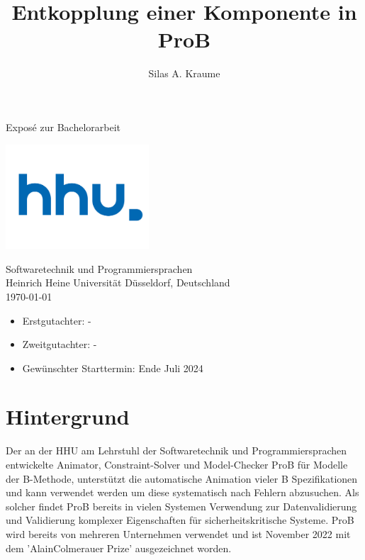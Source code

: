 \documentclass[11pt,a4paper]{scrartcl}
\begin{document}
\author{Silas A. Kraume}
\title{Entkopplung einer Komponente in ProB}

\begin{titlepage}
    \begin{center}
        \vspace*{1cm}
        \Huge
        \makeatletter
        \textbf{\@title}
        \makeatother
        \vspace{1.5cm}

        \LARGE
        \makeatletter
        \textbf{\@author}
        \makeatother
        \vfill

        Exposé zur Bachelorarbeit

        \vfill

        \includegraphics[width=0.4\textwidth]{hhu-logo}

        \Large
        Softwaretechnik und Programmiersprachen\\
        Heinrich Heine Universität Düsseldorf, Deutschland\\
        \today
        \vfill

        \large\begin{itemize}
            \item Erstgutachter: \space\space\space -
            \item Zweitgutachter: -
            \item Gewünschter Starttermin: Ende Juli 2024
        \end{itemize}

    \end{center}
\end{titlepage}

\section{Hintergrund}
Der an der HHU am Lehrstuhl der Softwaretechnik und Programmiersprachen entwickelte Animator, Constraint-Solver und Model-Checker ProB \parencite{ProB_2} für Modelle der B-Methode,
unterstützt die automatische Animation vieler B Spezifikationen und kann verwendet werden um diese systematisch nach Fehlern abzusuchen.
Als solcher findet ProB bereits in vielen Systemen Verwendung zur Datenvalidierung und Validierung komplexer Eigenschaften für sicherheitskritische Systeme.
ProB wird bereits von mehreren Unternehmen verwendet und ist November 2022 mit dem 'AlainColmerauer Prize' ausgezeichnet worden.
\end{document}
